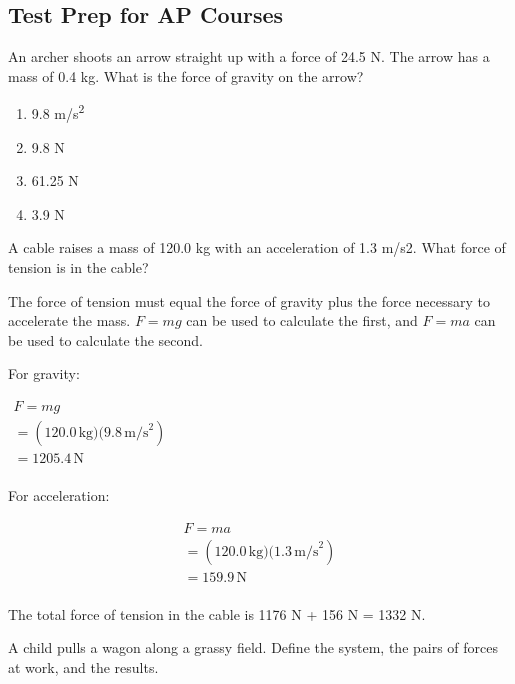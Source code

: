 \documentclass[
]{book}
\providecommand{\tightlist}{%
  \setlength{\itemsep}{0pt}\setlength{\parskip}{0pt}}
\newenvironment{ap-test-prep}{}{}
\begin{document}
\hypertarget{fs-id1625453}{}
\begin{ap-test-prep}

\hypertarget{test-prep-for-ap-courses-11}{%
\subsection{Test Prep for AP Courses}\label{test-prep-for-ap-courses-11}}

\hypertarget{fs-id1367314}{}
\leavevmode\hypertarget{fs-id1367317}{}%
An archer shoots an arrow straight up with a force of 24.5 N. The arrow
has a mass of 0.4 kg. What is the force of gravity on the arrow?

\begin{enumerate}
\def\labelenumi{\alph{enumi}.}
\tightlist
\item
  9.8 m/s\textsuperscript{2}
\item
  9.8 N
\item
  61.25 N
\item
  3.9 N
\end{enumerate}

\hypertarget{fs-id1458737}{}
\leavevmode\hypertarget{fs-id1796443}{}%
A cable raises a mass of 120.0 kg with an acceleration of 1.3 m/s2. What
force of tension is in the cable?

\leavevmode\hypertarget{fs-id1678045}{}%
The force of tension must equal the force of gravity plus the force
necessary to accelerate the mass. \(F = mg\) can be used to calculate the
first, and \(F = ma\) can be used to calculate the second.

For gravity:

\(\begin{array}{l} {F = mg} \\ {= (120.0\,\text{kg)(9}\text{.8}\,\text{m/s}^{\text{2}})} \\ {= 1205.4\,\text{N}} \\ \end{array}\)

For acceleration:

\[\begin{array}{l}
{F = ma} \\
{= (120.0\,\text{kg)(1}\text{.3}\,\text{m/s}^{\text{2}})} \\
{= 159.9\,\text{N}} \\
\end{array}\]

The total force of tension in the cable is 1176 N + 156 N = 1332 N.

\hypertarget{fs-id1591869}{}
\leavevmode\hypertarget{fs-id1482029}{}%
A child pulls a wagon along a grassy field. Define the system, the pairs
of forces at work, and the results.


\end{ap-test-prep}
\end{document}
